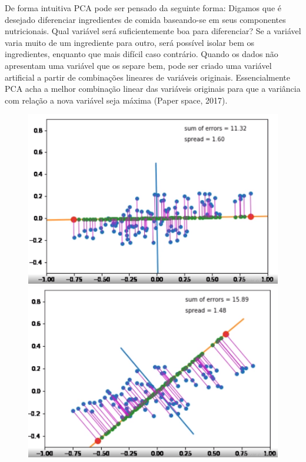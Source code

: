 \documentclass[12pt]{report}
\begin{document}
De forma intuitiva PCA pode ser pensado da seguinte forma: Digamos que é desejado diferenciar ingredientes de comida baseando-se em seus componentes nutricionais. Qual variável será suficientemente boa para diferenciar? Se a variável varia muito de um ingrediente para outro, será possível isolar bem os ingredientes, enquanto que mais difícil caso contrário. Quando os dados não apresentam uma variável que os separe bem, pode ser criado uma variável artificial a partir de combinações lineares de variáveis originais. Essencialmente PCA acha a melhor combinação linear das variáveis originais para que a variância com relação a nova variável seja máxima (Paper space, 2017).

\begin{figure}
  \centering
  \begin{minipage}[b]{0.4\textwidth}
    \includegraphics[width=\textwidth]{images/1.png}
  \end{minipage}
  \hfill
  \begin{minipage}[b]{0.4\textwidth}
    \includegraphics[width=\textwidth]{images/2.png}

\end{minipage}
\end{figure}
\end{document}
